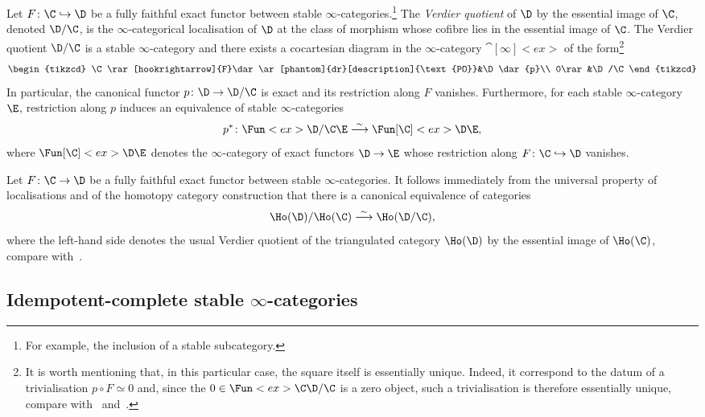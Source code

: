 \documentclass[a4paper]{amsart}
\begin{document}
\begin{defprop}[{\cite[Theorem~I.3.3.]{NS18}}]
  \label{defprop:Verdier_quotient}
  Let $F\colon \C\hookrightarrow\D$ be a fully faithful exact functor between
  stable $\infty$-categories.\footnote{For example, the inclusion of a stable
    subcategory.} The \emph{Verdier quotient} of $\D$ by the essential image of
  $\C$, denoted $\D/\C$, is the $\infty$-categorical localisation of $\D$ at the
  class of morphism whose cofibre lies in the essential image of $\C$. The
  Verdier quotient $\D/\C$ is a stable $\infty$-category and there exists a
  cocartesian diagram in the $\infty$-category $\cat[\infty]<ex>$ of the
  form\footnote{It is worth mentioning that, in this particular case, the square
  itself is essentially unique. Indeed, it correspond to the datum of a trivialisation
  $p\circ F\simeq 0$ and, since the $0\in\Fun<ex>{\C}{\D/\C}$ is a zero object,
  such a trivialisation is therefore essentially unique, compare
  with~\cite[Definition~5.8]{BGT13} and~\cite[Remark~3.2]{Dyc21}.}
  \[
    \begin{tikzcd}
      \C\rar[hookrightarrow]{F}\dar\ar[phantom]{dr}[description]{\text{PO}}&\D\dar{p}\\
      0\rar&\D/\C
    \end{tikzcd}
  \]
  In particular, the canonical functor $p\colon\D\to\D/\C$ is exact and its
  restriction along $F$ vanishes. Furthermore, for each stable $\infty$-category
  $\E$, restriction along $p$ induces an equivalence of stable
  $\infty$-categories
  \[
    p^*\colon\Fun<ex>{\D/\C}{\E}\stackrel{\sim}{\longrightarrow}\Fun[\C]<ex>{\D}{\E},
  \]
  where $\Fun[\C]<ex>{\D}{\E}$ denotes the $\infty$-category of exact functors
  $\D\to\E$ whose restriction along $F\colon \C\hookrightarrow\D$ vanishes.
\end{defprop}

\begin{remark}
  Let $F\colon \C\to\D$ be a fully faithful exact functor between stable
  $\infty$-categories. It follows immediately from the universal property of
  localisations and of the homotopy category construction that there is a
  canonical equivalence of categories
  \[
    \Ho(\D)/\Ho(\C)\stackrel{\sim}{\longrightarrow}\Ho(\D/\C),
  \]
  where the left-hand side denotes the usual Verdier quotient of the
  triangulated category $\Ho(\D)$ by the essential image of $\Ho(\C)$, compare
  with~\cite[Remark~7.1.6]{Cis19}.
\end{remark}

\subsection{Idempotent-complete stable $\infty$-categories}
\end{document}
